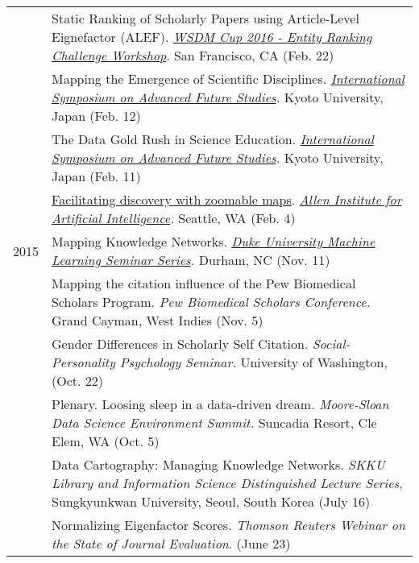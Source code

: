\documentclass[11pt]{article}
\begin{document}
\begin{longtable}{p{0.5in}|p{5.5in}}
  		& Static Ranking of Scholarly Papers using Article-Level Eignefactor (ALEF). \textit{\href{https://wsdmcupchallenge.azurewebsites.net/Home/Workshop}{WSDM Cup 2016 - Entity Ranking Challenge Workshop}}. San Francisco, CA (Feb. 22) \\ 

  		& Mapping the Emergence of Scientific Disciplines. \textit{\href{http://www2.yukawa.kyoto-u.ac.jp/~future/IS20160212/index.html}{International Symposium on Advanced Future Studies}.} Kyoto University, Japan (Feb. 12) \\

  		& The Data Gold Rush in Science Education. \textit{\href{http://www.gsee-kyoto.kier.kyoto-u.ac.jp/GSEEKyoto2016_Program.html}{International Symposium on Advanced Future Studies}.} Kyoto University, Japan (Feb. 11) \\

  		& \href{http://www.jevinwest.org/presentations/AI2_jevin_west.pdf}{Facilitating discovery with zoomable maps}. \textit{\href{http://www.gsee-kyoto.kier.kyoto-u.ac.jp/GSEEKyoto2016_Program.html}{Allen Institute for Artificial Intelligence}.} Seattle, WA (Feb. 4) \\


  2015  

  		& Mapping Knowledge Networks. \textit{\href{http://machinelearning.duke.edu/education/seminar-series}{Duke University Machine Learning Seminar Series}.} Durham, NC (Nov. 11) \\

  		& Mapping the citation influence of the Pew Biomedical Scholars Program. \textit{Pew Biomedical Scholars Conference.} Grand Cayman, West Indies (Nov. 5) \\

  		& Gender Differences in Scholarly Self Citation. \textit{Social-Personality Psychology Seminar.} University of Washington, (Oct. 22) \\

  		& Plenary. Loosing sleep in a data-driven dream. \textit{Moore-Sloan Data Science Environment Summit.} Suncadia Resort, Cle Elem, WA (Oct. 5) \\

  		& Data Cartography: Managing Knowledge Networks. \textit{SKKU Library and Information Science Distinguished Lecture Series}, Sungkyunkwan University, Seoul, South Korea (July 16) \\
  		
  		& Normalizing Eigenfactor Scores. \textit{Thomson Reuters Webinar on the State of Journal Evaluation}. (June 23) \\


\end{longtable}
\end{document}
